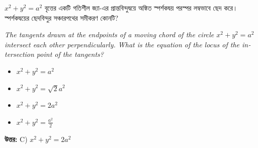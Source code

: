 \documentclass[12pt, a4paper]{article}
\begin{document}
\vspace{2em}

\begin{tcolorbox}[questionbox={প্রশ্ন (Question) 37}]
    \noindent
    $x^2 + y^2 = a^2$ বৃত্তের একটি গতিশীল জ্যা-এর প্রান্তবিন্দুদ্বয়ে অঙ্কিত স্পর্শকদ্বয় পরস্পর লম্বভাবে ছেদ করে। স্পর্শকদ্বয়ের ছেদবিন্দুর সঞ্চারপথের সমীকরণ কোনটি?
    
    \vspace{0.8em}
    \begin{english}
    \noindent\textit{\color{darkgray}
    The tangents drawn at the endpoints of a moving chord of the circle $x^2 + y^2 = a^2$ intersect each other perpendicularly. What is the equation of the locus of the intersection point of the tangents?
    }
    \end{english}
\end{tcolorbox}

\begin{itemize}[label={}, leftmargin=1cm, itemsep=0.5em]
    \item[\textbf{A)}] $x^2 + y^2 = a^2$
    \item[\textbf{B)}] $x^2 + y^2 = \sqrt{2}a^2$
    \item[\textbf{C)}] $x^2 + y^2 = 2a^2$
    \item[\textbf{D)}] $x^2 + y^2 = \frac{a^2}{2}$
\end{itemize}

\vspace{0.5em}
\begin{tcolorbox}[answerbox]
    \textbf{\color{success} উত্তর:} C) $x^2 + y^2 = 2a^2$
\end{tcolorbox}
\vspace{1em}
\end{document}
